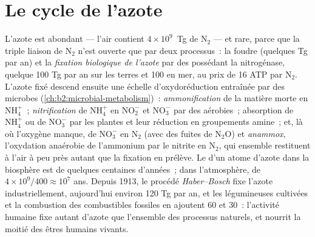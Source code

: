 \section{Le cycle de l'azote}

\begin{proposition}\label{prop:b2:biogeochemical-cycles:nitrogen}
L'azote est abondant --- l'air contient $4\times 10^{9}$~Tg de
$\mathrm{N_2}$ --- et rare, parce que la triple liaison de $\mathrm{N_2}$ n'est ouverte
que par deux processus~: la foudre (quelques Tg par an) et la
\emph{fixation biologique de l'azote} par des  possédant la
nitrogénase, quelque 100 Tg par an sur les terres et 100 en mer, au prix
de 16 ATP par $\mathrm{N_2}$. L'azote fixé descend ensuite une échelle
d'oxydoréduction entraînée par des microbes (\cref{ch:b2:microbial-metabolism})~:
\emph{ammonification} de la matière morte en $\mathrm{NH_4^{+}}$~;
\emph{nitrification} de $\mathrm{NH_4^{+}}$ en $\mathrm{NO_2^{-}}$ et $\mathrm{NO_3^{-}}$ par
des  aérobies~; absorption de $\mathrm{NH_4^{+}}$ ou de $\mathrm{NO_3^{-}}$ par les plantes
et leur réduction en groupements amine~; et, là où l'oxygène manque,
\emph{} de $\mathrm{NO_3^{-}}$ en $\mathrm{N_2}$ (avec des fuites de $\mathrm{N_2O}$)
et \emph{anammox}, l'oxydation anaérobie de l'ammonium par le
nitrite en $\mathrm{N_2}$, qui ensemble restituent à l'air à peu près autant
que la fixation en prélève. Le  d'un atome d'azote dans
la biosphère est de quelques centaines d'années~; dans l'atmosphère, de $4\times
10^{9}/400 \approx 10^{7}$ ans. Depuis 1913, le procédé \emph{Haber--Bosch}
fixe l'azote industriellement, aujourd'hui environ 120 Tg par an,
et les légumineuses cultivées et la combustion des combustibles fossiles
en ajoutent 60 et 30~: l'activité humaine fixe autant d'azote que
l'ensemble des processus naturels, et nourrit la moitié des êtres humains
vivants.
\end{proposition}

